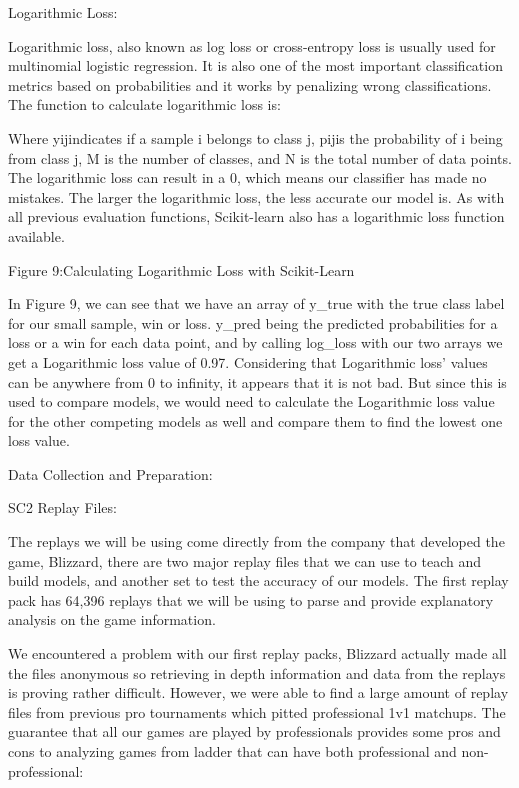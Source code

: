 \documentclass[a4paper,12pt]{report}
\begin{document}
Logarithmic Loss:

Logarithmic loss, also known as log loss or cross-entropy loss is usually used for multinomial logistic regression. It is also one of the most important classification metrics based on probabilities and it works by penalizing wrong classifications. The function to calculate logarithmic loss is:



Where yijindicates if a sample i belongs to class j, pijis the probability of i being from class j, M is the number of classes, and N is the total number of data points. The logarithmic loss can result in a 0, which means our classifier has made no mistakes. The larger the logarithmic loss, the less accurate our model is. As with all previous evaluation functions, Scikit-learn also has a logarithmic loss function available.


Figure 9:Calculating Logarithmic Loss with Scikit-Learn

In Figure 9, we can see that we have an array of y\_true with the true class label for our small sample, win or loss. y\_pred being the predicted probabilities for a loss or a win for each data point, and by calling log\_loss with our two arrays we get a Logarithmic loss value of 0.97. Considering that Logarithmic loss’ values can be anywhere from 0 to infinity, it appears that it is not bad. But since this is used to compare models, we would need to calculate the Logarithmic loss value for the other competing models as well and compare them to find the lowest one loss value.

Data Collection and Preparation:

SC2 Replay Files:

The replays we will be using come directly from the company that developed the game, Blizzard, there are two major replay files that we can use to teach and build models, and another set to test the accuracy of our models. The first replay pack has 64,396 replays that we will be using to parse and provide explanatory analysis on the game information.

We encountered a problem with our first replay packs, Blizzard actually made all the files anonymous so retrieving in depth information and data from the replays is proving rather difficult. However, we were able to find a large amount of replay files from previous pro tournaments which pitted professional 1v1 matchups. The guarantee that all our games are played by professionals provides some pros and cons to analyzing games from ladder that can have both professional and non-professional:
\end{document}

